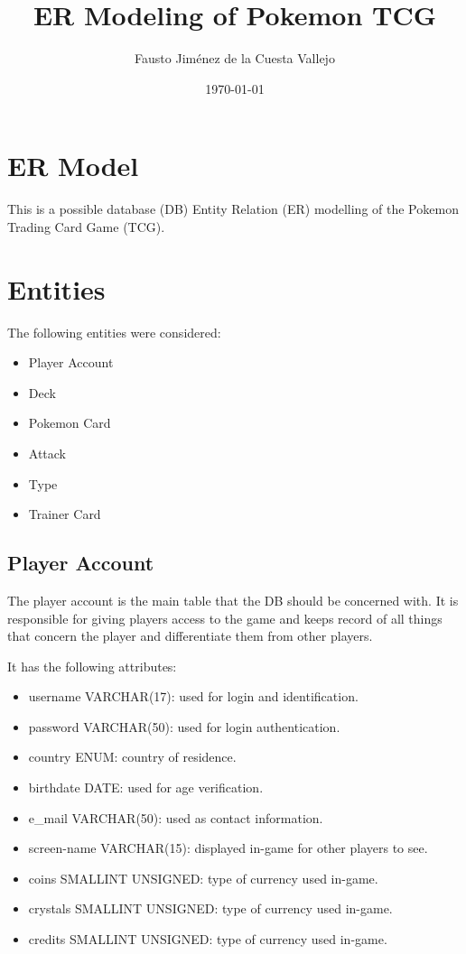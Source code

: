 \documentclass{article}
\title{ER Modeling of Pokemon TCG}
\author{Fausto Jiménez de la Cuesta Vallejo}
\date{\today}
\begin{document}
\maketitle
\tableofcontents

\section{ER Model}

This is a possible database (DB) Entity Relation (ER) modelling of the Pokemon 
Trading Card Game (TCG).

\section{Entities}

The following entities were considered:

\begin{itemize}
    \item Player Account
    \item Deck
    \item Pokemon Card
    \item Attack
    \item Type
    \item Trainer Card
\end{itemize}

\subsection{Player Account}

The player account is the main table that the DB should be concerned with. 
It is responsible for giving players access to the game and keeps record of 
all things that concern the player and differentiate them from other players.

It has the following attributes:

\begin{itemize}
    \item username VARCHAR(17): used for login and identification.
    \item password VARCHAR(50): used for login authentication.
    \item country ENUM: country of residence.
    \item birthdate DATE: used for age verification.
    \item e\_mail VARCHAR(50): used as contact information.
    \item screen-name VARCHAR(15): displayed in-game for other players to see.
    \item coins SMALLINT UNSIGNED: type of currency used in-game.
    \item crystals SMALLINT UNSIGNED: type of currency used in-game.
    \item credits SMALLINT UNSIGNED: type of currency used in-game.
\end{itemize}
\end{document}
